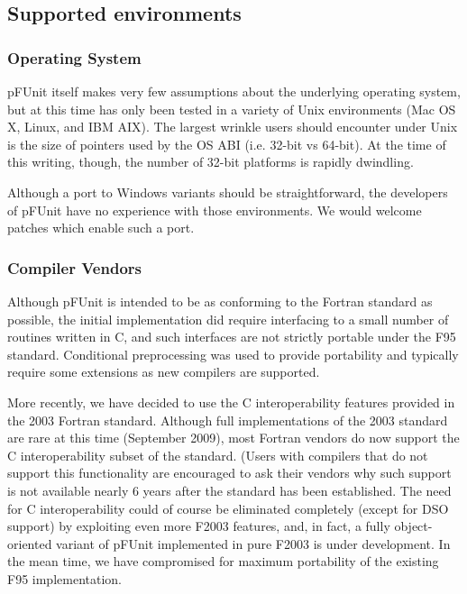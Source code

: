 \documentclass[10pt]{article}
\newcommand{\pfunit}{{\sc pFUnit }}
\begin{document}
\subsection{Supported environments}
\subsubsection{Operating System}

\pfunit itself makes very few assumptions about the underlying
operating system, but at this time has only been tested in a variety
of Unix environments  (Mac OS X, Linux, and IBM AIX).
The largest wrinkle users should encounter under Unix is the size of
pointers used by the OS ABI (i.e. 32-bit vs 64-bit).  At the time of
this writing, though, the number of 32-bit platforms is rapidly
dwindling.

Although a port to Windows variants should be straightforward, the
developers of \pfunit have no experience with those environments.  We
would welcome patches which enable such a port.

\subsubsection{Compiler Vendors}

Although \pfunit is intended to be as conforming to the Fortran
standard as possible, the initial implementation did require
interfacing to a small number of routines written in C, and such
interfaces are not strictly portable under the F95 standard.
Conditional preprocessing was used to provide portability and
typically require some extensions as new compilers are supported.

More recently, we have decided to use the C interoperability features
provided in the 2003 Fortran standard.  Although full implementations
of the 2003 standard are rare at this time (September 2009), most
Fortran vendors do now support the C interoperability subset of the
standard.  (Users with compilers that do not support this
functionality are encouraged to ask their vendors why such support is
not available nearly 6 years after the standard has been established.
The need for C interoperability could of course be eliminated
completely (except for DSO support) by exploiting even more F2003
features, and, in fact, a fully object-oriented variant of \pfunit
implemented in pure F2003 is under development.  In the mean time, we
have compromised for maximum portability of the existing F95
implementation.\\
\end{document}
